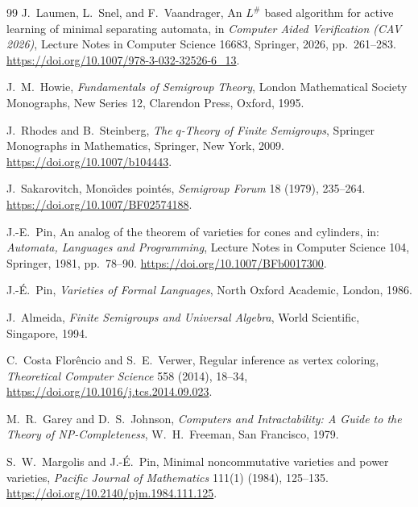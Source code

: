\documentclass[10pt,a4paper]{ltjsarticle}
\theoremstyle{definition}
\theoremstyle{remark}
\begin{document}
\begin{thebibliography}{99}
J.~Laumen, L.~Snel, and F.~Vaandrager,
\newblock An $L^{\#}$ based algorithm for active learning of minimal separating automata,
\newblock in \emph{Computer Aided Verification (CAV 2026)},
Lecture Notes in Computer Science 16683, Springer, 2026, pp.~261--283.
\newblock \url{https://doi.org/10.1007/978-3-032-32526-6_13}.







J.~M.~Howie,
\newblock \emph{Fundamentals of Semigroup Theory},
\newblock London Mathematical Society Monographs, New Series 12,
Clarendon Press, Oxford, 1995.

J.~Rhodes and B.~Steinberg,
\newblock \emph{The $q$-Theory of Finite Semigroups},
\newblock Springer Monographs in Mathematics, Springer, New York, 2009.
\newblock \url{https://doi.org/10.1007/b104443}.

J.~Sakarovitch,
\newblock Mono\"{\i}des point\'es,
\newblock \emph{Semigroup Forum} 18 (1979), 235--264.
\newblock \url{https://doi.org/10.1007/BF02574188}.

J.-E.~Pin,
\newblock An analog of the theorem of varieties for cones and cylinders,
\newblock in: \emph{Automata, Languages and Programming}, Lecture Notes in
Computer Science 104, Springer, 1981, pp.~78--90.
\newblock \url{https://doi.org/10.1007/BFb0017300}.

J.-\'E.~Pin,
\newblock \emph{Varieties of Formal Languages},
\newblock North Oxford Academic, London, 1986.

J.~Almeida,
\newblock \emph{Finite Semigroups and Universal Algebra},
\newblock World Scientific, Singapore, 1994.


C.~Costa Flor\^encio and S.~E.~Verwer,
\newblock Regular inference as vertex coloring,
\newblock \emph{Theoretical Computer Science} 558 (2014), 18--34,
\newblock \url{https://doi.org/10.1016/j.tcs.2014.09.023}.

M.~R.~Garey and D.~S.~Johnson,
\newblock \emph{Computers and Intractability: A Guide to the Theory of
NP-Completeness},
\newblock W.~H.~Freeman, San Francisco, 1979.



S.~W.~Margolis and J.-\'E.~Pin,
\newblock Minimal noncommutative varieties and power varieties,
\newblock \emph{Pacific Journal of Mathematics} 111(1) (1984), 125--135.
\newblock \url{https://doi.org/10.2140/pjm.1984.111.125}.




\end{thebibliography}
\end{document}
